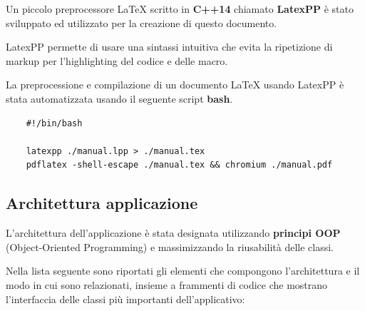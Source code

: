 \documentclass[12pt]{report}
\renewcommand\emph{\textbf}
\begin{document}
            Un piccolo preprocessore \LaTeX{} scritto in \emph{C++14}  chiamato \emph{LatexPP} è stato sviluppato ed utilizzato per la creazione di questo documento.

            LatexPP permette di usare una sintassi intuitiva che evita la ripetizione di markup per l'highlighting del codice e delle macro.

            La preprocessione e compilazione di un documento \LaTeX{} usando LatexPP è stata automatizzata usando il seguente script \emph{bash}.

            \begin{verbatim}
    #!/bin/bash

    latexpp ./manual.lpp > ./manual.tex
    pdflatex -shell-escape ./manual.tex && chromium ./manual.pdf
            \end{verbatim}


        \subsection{Architettura applicazione}

        L'architettura dell'applicazione è stata designata utilizzando \emph{principi OOP} (Object-Oriented Programming) e massimizzando la riusabilità delle classi.

        Nella lista seguente sono riportati gli elementi che compongono l'architettura e il modo in cui sono relazionati, insieme a frammenti di codice che mostrano l'interfaccia delle classi più importanti dell'applicativo:
\end{document}
